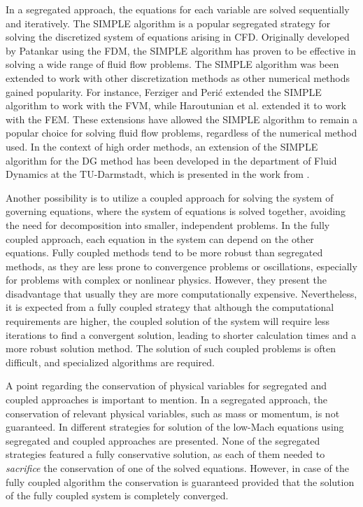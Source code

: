 In a segregated approach, the equations for each variable are solved sequentially and iteratively. The \gls{SIMPLE} algorithm is a popular segregated strategy for solving the discretized system of equations arising in \gls{CFD}. Originally developed by Patankar \parencite{patankarNumericalHeatTransfer1980} using the \gls{FDM}, the SIMPLE algorithm has proven to be effective in solving a wide range of fluid flow problems. The SIMPLE algorithm was been extended to work with other discretization methods as other numerical methods gained popularity. For instance, Ferziger and Perić \parencite{ferzigerComputationalMethodsFluid2002} extended the SIMPLE algorithm to work with the \gls{FVM}, while Haroutunian et al. \parencite{haroutunianSegregatedFiniteElement1993} extended it to work with the \gls{FEM}. These extensions have allowed the SIMPLE algorithm to remain a popular choice for solving fluid flow problems, regardless of the numerical method used. In the context of high order methods, an extension of the SIMPLE algorithm for the DG method has been developed in the department of Fluid Dynamics at the TU-Darmstadt, which is presented in the work from \textcite{kleinHighorderDiscontinuousGalerkin2015}. 

Another possibility is to utilize a coupled approach for solving the system of governing equations, where the system of equations is solved together, avoiding the need for decomposition into smaller, independent problems. In the fully coupled approach, each equation in the system can depend on the other equations. Fully coupled methods tend to be more robust than segregated methods, as they are less prone to convergence problems or oscillations, especially for problems with complex or nonlinear physics. However, they present the disadvantage that usually they are more computationally expensive. Nevertheless, it is expected from a fully coupled strategy that although the computational requirements are higher, the coupled solution of the system will require less iterations to find a convergent solution, leading to shorter calculation times and a more robust solution method.  The solution of such coupled problems is often difficult, and specialized algorithms are required. 

A point regarding the conservation of physical variables for segregated and coupled approaches is important to mention. In a segregated approach, the conservation of relevant physical variables, such as mass or momentum, is not guaranteed. In \textcite{knikkerComparativeStudyHighorder2011} different strategies for solution of the low-Mach equations using segregated and coupled approaches are presented. None of the segregated strategies featured a fully conservative solution, as each of them needed to \textit{sacrifice} the conservation of one of the solved equations. However, in case of the fully coupled algorithm the conservation is guaranteed provided that the solution of the fully coupled system is completely converged.

